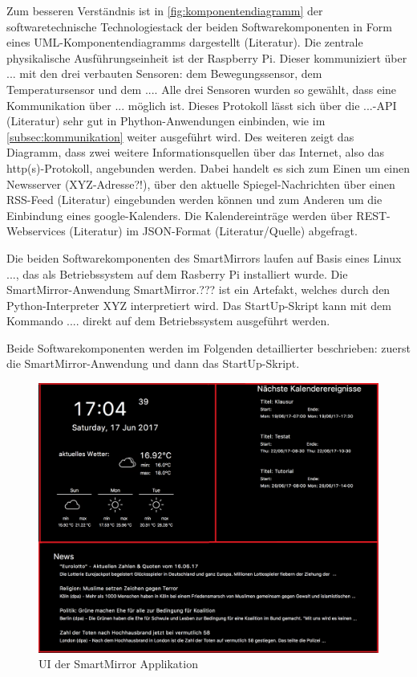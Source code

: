 Zum besseren Verständnis ist in \autoref{fig:komponentendiagramm} der softwaretechnische Technologiestack der beiden Softwarekomponenten in Form eines UML-Komponentendiagramms dargestellt (Literatur). Die zentrale physikalische Ausführungseinheit ist der Raspberry Pi. Dieser kommuniziert über ... mit den drei verbauten Sensoren: dem Bewegungssensor, dem Temperatursensor und dem .... Alle drei Sensoren wurden so gewählt, dass eine Kommunikation über ... möglich ist. Dieses Protokoll lässt sich über die ...-API (Literatur) sehr gut in Phython-Anwendungen einbinden, wie im \autoref{subsec:kommunikation} weiter ausgeführt wird. Des weiteren zeigt das Diagramm, dass zwei weitere Informationsquellen über das Internet, also das http(s)-Protokoll, angebunden werden. Dabei handelt es sich zum Einen um  
einen Newsserver (XYZ-Adresse?!), über den aktuelle Spiegel-Nachrichten über einen RSS-Feed (Literatur) eingebunden werden können und zum Anderen um die Einbindung eines google-Kalenders. Die Kalendereinträge werden über  REST-Webservices (Literatur) im JSON-Format (Literatur/Quelle) abgefragt. 

Die beiden Softwarekomponenten des SmartMirrors laufen auf Basis eines Linux ..., das als Betriebssystem auf dem Rasberry Pi installiert wurde. Die SmartMirror-Anwendung \glqq SmartMirror.??? \grqq ist ein Artefakt, welches durch den Python-Interpreter \glqq XYZ \grqq interpretiert wird. Das StartUp-Skript kann mit dem Kommando \glqq .... \grqq direkt auf dem Betriebssystem ausgeführt werden. 

Beide Softwarekomponenten werden im Folgenden detaillierter beschrieben: zuerst die SmartMirror-Anwendung und dann das StartUp-Skript.




\begin{figure}
	\centering
	\includegraphics[width=0.7\linewidth]{bilder/grafOberflaeche}
	\caption[UI der SmartMirror Applikation]{UI der SmartMirror Applikation}
	\label{fig:grafoberflaeche}
\end{figure}

